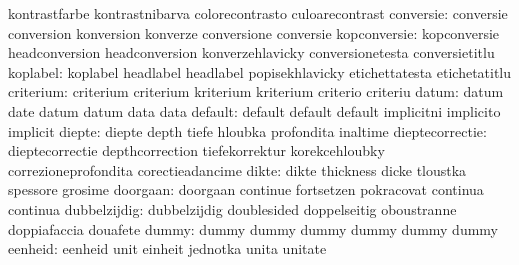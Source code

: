                            kontrastfarbe             kontrastnibarva
                           colorecontrasto           culoarecontrast
                conversie: conversie                 conversion
                           konversion                konverze
                           conversione               conversie
             kopconversie: kopconversie              headconversion
                           headconversion            konverzehlavicky
                           conversionetesta          conversietitlu %
                 koplabel: koplabel                  headlabel
                           headlabel                 popisekhlavicky
                           etichettatesta            etichetatitlu %
                criterium: criterium                 criterium
                           kriterium                 kriterium
                           criterio                  criteriu
                    datum: datum                     date
                           datum                     datum
                           data                      data
                  default: default                   default
                           default                   implicitni
                           implicito                 implicit
                   diepte: diepte                    depth
                           tiefe                     hloubka
                           profondita                inaltime
          dieptecorrectie: dieptecorrectie           depthcorrection
                           tiefekorrektur            korekcehloubky
                           correzioneprofondita      corectieadancime
                    dikte: dikte                     thickness
                           dicke                     tloustka
                           spessore                  grosime
                 doorgaan: doorgaan                  continue
                           fortsetzen                pokracovat
                           continua                  continua
             dubbelzijdig: dubbelzijdig              doublesided
                           doppelseitig              oboustranne
                           doppiafaccia              douafete
                    dummy: dummy                     dummy
                           dummy                     dummy
                           dummy                     dummy
                  eenheid: eenheid                   unit
                           einheit                   jednotka
                           unita                     unitate
